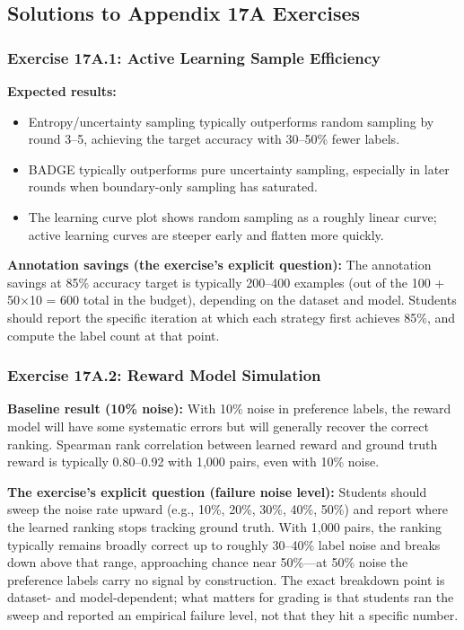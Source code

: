\subsection*{Solutions to Appendix 17A Exercises}

\subsubsection*{Exercise 17A.1: Active Learning Sample Efficiency}

\textbf{Expected results:}
\begin{itemize}
    \item Entropy/uncertainty sampling typically outperforms random sampling by round 3--5, achieving the target accuracy with 30--50\% fewer labels.
    \item BADGE typically outperforms pure uncertainty sampling, especially in later rounds when boundary-only sampling has saturated.
    \item The learning curve plot shows random sampling as a roughly linear curve; active learning curves are steeper early and flatten more quickly.
\end{itemize}

\textbf{Annotation savings (the exercise's explicit question):} The annotation savings at 85\% accuracy target is typically 200--400 examples (out of the 100 + 50×10 = 600 total in the budget), depending on the dataset and model. Students should report the specific iteration at which each strategy first achieves 85\%, and compute the label count at that point.

\subsubsection*{Exercise 17A.2: Reward Model Simulation}

\textbf{Baseline result (10\% noise):} With 10\% noise in preference labels, the reward model will have some systematic errors but will generally recover the correct ranking. Spearman rank correlation between learned reward and ground truth reward is typically 0.80--0.92 with 1,000 pairs, even with 10\% noise.

\textbf{The exercise's explicit question (failure noise level):} Students should sweep the noise rate upward (e.g., 10\%, 20\%, 30\%, 40\%, 50\%) and report where the learned ranking stops tracking ground truth. With 1,000 pairs, the ranking typically remains broadly correct up to roughly 30--40\% label noise and breaks down above that range, approaching chance near 50\%---at 50\% noise the preference labels carry no signal by construction. The exact breakdown point is dataset- and model-dependent; what matters for grading is that students ran the sweep and reported an empirical failure level, not that they hit a specific number.


